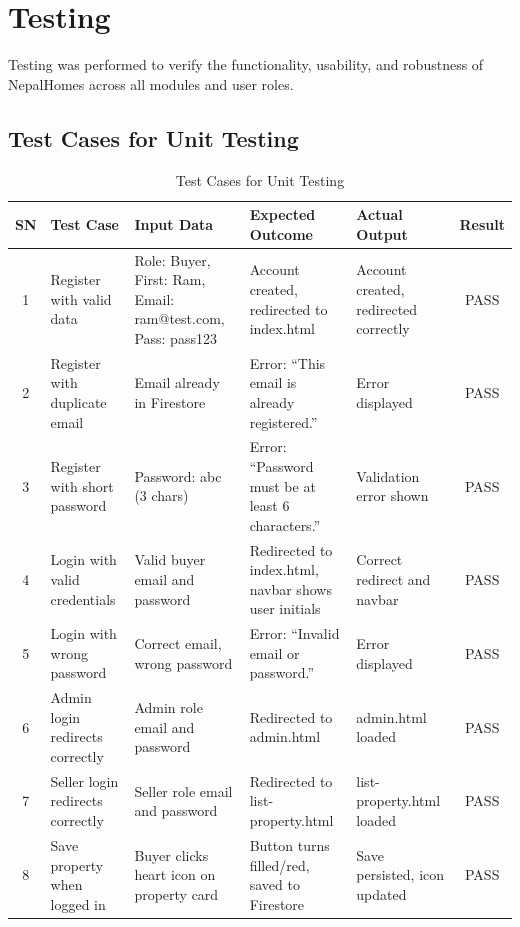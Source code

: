 \documentclass[12pt,a4paper]{report}
\begin{document}
\section{Testing}

Testing was performed to verify the functionality, usability, and robustness of
NepalHomes across all modules and user roles.

\subsection{Test Cases for Unit Testing}

\begin{table}[H]
\centering
\caption{Test Cases for Unit Testing}
\label{tab:unit-tests}
\renewcommand{\arraystretch}{1.3}
\footnotesize
\begin{tabularx}{\textwidth}{|c|X|X|X|X|c|}
\hline
\textbf{SN} & \textbf{Test Case} & \textbf{Input Data} &
\textbf{Expected Outcome} & \textbf{Actual Output} & \textbf{Result} \\
\hline
1 & Register with valid data &
  Role: Buyer, First: Ram, Email: ram@test.com, Pass: pass123 &
  Account created, redirected to index.html &
  Account created, redirected correctly & PASS \\
\hline
2 & Register with duplicate email &
  Email already in Firestore & Error: ``This email is already registered.'' &
  Error displayed & PASS \\
\hline
3 & Register with short password &
  Password: abc (3 chars) &
  Error: ``Password must be at least 6 characters.'' &
  Validation error shown & PASS \\
\hline
4 & Login with valid credentials &
  Valid buyer email and password &
  Redirected to index.html, navbar shows user initials &
  Correct redirect and navbar & PASS \\
\hline
5 & Login with wrong password &
  Correct email, wrong password &
  Error: ``Invalid email or password.'' &
  Error displayed & PASS \\
\hline
6 & Admin login redirects correctly &
  Admin role email and password &
  Redirected to admin.html &
  admin.html loaded & PASS \\
\hline
7 & Seller login redirects correctly &
  Seller role email and password &
  Redirected to list-property.html &
  list-property.html loaded & PASS \\
\hline
8 & Save property when logged in &
  Buyer clicks heart icon on property card &
  Button turns filled/red, saved to Firestore &
  Save persisted, icon updated & PASS \\

\end{tabularx}
\end{table}
\end{document}
